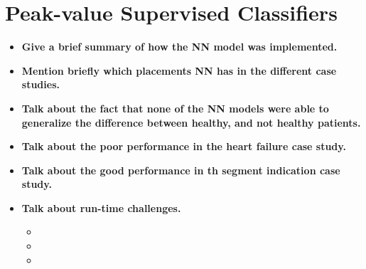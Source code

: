 \section{Peak-value Supervised Classifiers}

\begin{itemize}
    \item \textbf{Give a brief summary of how the NN model was implemented.}
    \item \textbf{Mention briefly which placements NN has in the different case studies.}
    \item \textbf{Talk about the fact that none of the NN models were able to generalize the difference between healthy, and not healthy patients.}
    \item \textbf{Talk about the poor performance in the heart failure case study.}
    \item \textbf{Talk about the good performance in th segment indication case study.}
    \item \textbf{Talk about run-time challenges.}
    \begin{itemize}
        \item 
        \item 
        \item 
    \end{itemize}
\end{itemize}
